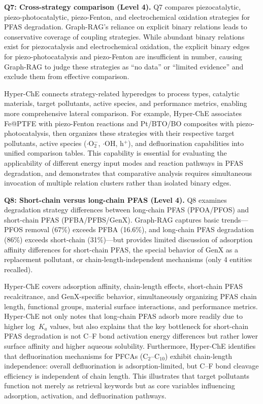 \textbf{Q7: Cross-strategy comparison (Level 4).} Q7 compares piezocatalytic, piezo-photocatalytic, piezo-Fenton, and electrochemical oxidation strategies for PFAS degradation. Graph-RAG's reliance on explicit binary relations leads to conservative coverage of coupling strategies. While abundant binary relations exist for piezocatalysis and electrochemical oxidation, the explicit binary edges for piezo-photocatalysis and piezo-Fenton are insufficient in number, causing Graph-RAG to judge these strategies as ``no data'' or ``limited evidence'' and exclude them from effective comparison.

Hyper-ChE connects strategy-related hyperedges to process types, catalytic materials, target pollutants, active species, and performance metrics, enabling more comprehensive lateral comparison. For example, Hyper-ChE associates Fe@PTFE with piezo-Fenton reactions and Pt/BTO/BO composites with piezo-photocatalysis, then organizes these strategies with their respective target pollutants, active species ($\cdot$O$_{2}^{-}$, $\cdot$OH, h$^{+}$), and defluorination capabilities into unified comparison tables. This capability is essential for evaluating the applicability of different energy input modes and reaction pathways in PFAS degradation, and demonstrates that comparative analysis requires simultaneous invocation of multiple relation clusters rather than isolated binary edges.

\textbf{Q8: Short-chain versus long-chain PFAS (Level 4).} Q8 examines degradation strategy differences between long-chain PFAS (PFOA/PFOS) and short-chain PFAS (PFBA/PFBS/GenX). Graph-RAG captures basic trends---PFOS removal (67\%) exceeds PFBA (16.6\%), and long-chain PFAS degradation (86\%) exceeds short-chain (31\%)---but provides limited discussion of adsorption affinity differences for short-chain PFAS, the special behavior of GenX as a replacement pollutant, or chain-length-independent mechanisms (only 4 entities recalled).

Hyper-ChE covers adsorption affinity, chain-length effects, short-chain PFAS recalcitrance, and GenX-specific behavior, simultaneously organizing PFAS chain length, functional groups, material surface interactions, and performance metrics. Hyper-ChE not only notes that long-chain PFAS adsorb more readily due to higher log~$K_{a}$ values, but also explains that the key bottleneck for short-chain PFAS degradation is not C--F bond activation energy differences but rather lower surface affinity and higher aqueous solubility. Furthermore, Hyper-ChE identifies that defluorination mechanisms for PFCAs (C$_{2}$--C$_{10}$) exhibit chain-length independence: overall defluorination is adsorption-limited, but C--F bond cleavage efficiency is independent of chain length. This illustrates that target pollutants function not merely as retrieval keywords but as core variables influencing adsorption, activation, and defluorination pathways.


